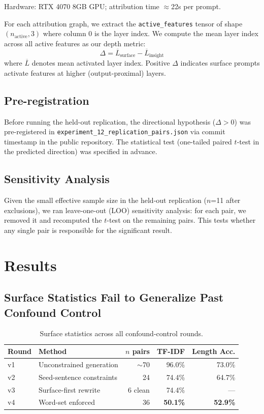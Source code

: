 \documentclass{article}
\begin{document}
Hardware: RTX 4070 8GB GPU; attribution time $\approx$22s per prompt.

For each attribution graph, we extract the \texttt{active\_features} tensor of shape 
$(n_\text{active}, 3)$ where column 0 is the layer index. We compute the mean layer index 
across all active features as our depth metric:
\begin{equation}
\Delta = \overline{L}_\text{surface} - \overline{L}_\text{insight}
\end{equation}
where $\overline{L}$ denotes mean activated layer index. Positive $\Delta$ indicates surface 
prompts activate features at higher (output-proximal) layers.

\subsection{Pre-registration}

Before running the held-out replication, the directional hypothesis ($\Delta > 0$) was 
pre-registered in \texttt{experiment\_12\_replication\_pairs.json} via commit timestamp in 
the public repository. The statistical test (one-tailed paired $t$-test in the predicted 
direction) was specified in advance.

\subsection{Sensitivity Analysis}

Given the small effective sample size in the held-out replication ($n$=11 after exclusions), 
we ran leave-one-out (LOO) sensitivity analysis: for each pair, we removed it and 
recomputed the $t$-test on the remaining pairs. This tests whether any single pair is 
responsible for the significant result.

\section{Results}

\subsection{Surface Statistics Fail to Generalize Past Confound Control}

\begin{table}[h]
\centering
\caption{Surface statistics across all confound-control rounds.}
\label{tab:surface_stats}
\begin{tabular}{llrrr}
\toprule
Round & Method & $n$ pairs & TF-IDF & Length Acc. \\
\midrule
v1 & Unconstrained generation & $\sim$70 & 96.0\% & 73.0\% \\
v2 & Seed-sentence constraints & 24 & 74.4\% & 64.7\% \\
v3 & Surface-first rewrite & 6 clean & 74.4\% & --- \\
v4 & Word-set enforced & 36 & \textbf{50.1\%} & \textbf{52.9\%} \\
\bottomrule
\end{tabular}
\end{table}
\end{document}
